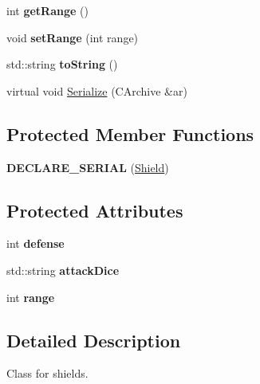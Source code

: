 \begin{DoxyCompactItemize}
\item 
\hypertarget{class_shield_af8b6fccff0ddb7851440da08b4c76c8f}{}\label{class_shield_af8b6fccff0ddb7851440da08b4c76c8f} 
int {\bfseries get\+Range} ()
\item 
\hypertarget{class_shield_a7e0638047be589b3ab2ca0c1349f3409}{}\label{class_shield_a7e0638047be589b3ab2ca0c1349f3409} 
void {\bfseries set\+Range} (int range)
\item 
\hypertarget{class_shield_a524d5884f91f2539db047cecd09d6bc8}{}\label{class_shield_a524d5884f91f2539db047cecd09d6bc8} 
std\+::string {\bfseries to\+String} ()
\item 
virtual void \hyperlink{class_shield_a8d045c43b16aab5fc474e696cb8a7f1f}{Serialize} (C\+Archive \&ar)
\end{DoxyCompactItemize}
\subsection*{Protected Member Functions}
\begin{DoxyCompactItemize}
\item 
\hypertarget{class_shield_a0bc1e651aeb25fcecd483c76a847bb61}{}\label{class_shield_a0bc1e651aeb25fcecd483c76a847bb61} 
{\bfseries D\+E\+C\+L\+A\+R\+E\+\_\+\+S\+E\+R\+I\+AL} (\hyperlink{class_shield}{Shield})
\end{DoxyCompactItemize}
\subsection*{Protected Attributes}
\begin{DoxyCompactItemize}
\item 
\hypertarget{class_shield_af22e87b1ecaf100736797e30df248a8e}{}\label{class_shield_af22e87b1ecaf100736797e30df248a8e} 
int {\bfseries defense}
\item 
\hypertarget{class_shield_a4bcf1d65dc7b666ffc5ca465c37d98b9}{}\label{class_shield_a4bcf1d65dc7b666ffc5ca465c37d98b9} 
std\+::string {\bfseries attack\+Dice}
\item 
\hypertarget{class_shield_ad5c23fb3c974dd066b089a2841c4e2dd}{}\label{class_shield_ad5c23fb3c974dd066b089a2841c4e2dd} 
int {\bfseries range}
\end{DoxyCompactItemize}


\subsection{Detailed Description}
Class for shields. 

